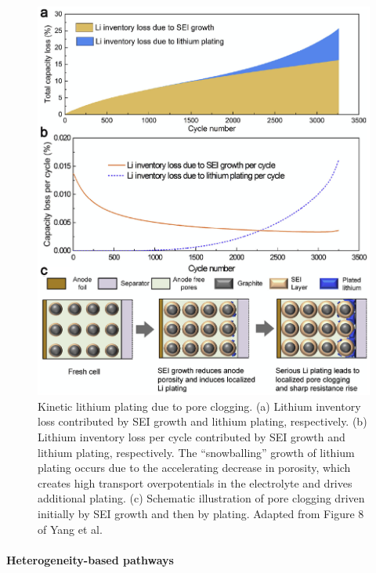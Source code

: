 \documentclass[journal=jpcl, manuscript=article, layout=onecolumn]{achemso}
\begin{document}
\begin{figure}[ht]
    \centering
    \includegraphics[scale=1]{figures/li_plating_porosity_yang.eps}
    \caption{Kinetic lithium plating due to pore clogging. (a) Lithium inventory loss contributed by SEI growth and lithium plating, respectively. (b) Lithium inventory loss per cycle contributed by SEI growth and lithium plating, respectively. The ``snowballing'' growth of lithium plating occurs due to the accelerating decrease in porosity, which creates high transport overpotentials in the electrolyte and drives additional plating. (c) Schematic illustration of pore clogging driven initially by SEI growth and then by plating. Adapted from Figure 8 of Yang et al.\cite{yang_modeling_2017}}
    \label{fig:pore_clogging}
\end{figure}

\paragraph{Heterogeneity-based pathways}
\end{document}
